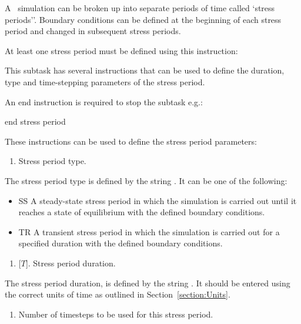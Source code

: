 \label{section:StressPeriods}
A \mfus\ simulation can be broken up into separate periods of time called `stress periods''.  Boundary conditions can be defined at the beginning of each stress period and changed in subsequent stress periods.

At least one stress period must be defined using this instruction:

    {This subtask has several instructions that can be used to define the duration, type and time-stepping parameters of the stress period.

    An end instruction is required to stop the subtask e.g.:

    {\Large \sf end stress period}
    }

These instructions can be used to define the stress period parameters:

    {
        \squish
        \begin{enumerate}
        \item {}  Stress period type.
        \end{enumerate}
        The stress period type is defined by the string .  It can be one of the following:
        \begin{itemize}
            \item \textsf{SS} A steady-state stress period in which the simulation is carried out until it reaches a state of equilibrium with the defined boundary conditions.
            \item \textsf{TR} A transient stress period in which the simulation is carried out for a specified duration with the defined boundary conditions.
        \end{itemize}
    }

    {
        \squish
        \begin{enumerate}
        \item {} [$T$].  Stress period duration.
        \end{enumerate}
        The stress period duration, is defined by the string .  It should be entered using the correct units of time as outlined in Section~\ref{section:Units}.
    }

    {
        \squish
        \begin{enumerate}
        \item {}  Number of timesteps to be used for this stress period.
        \end{enumerate}
    }

